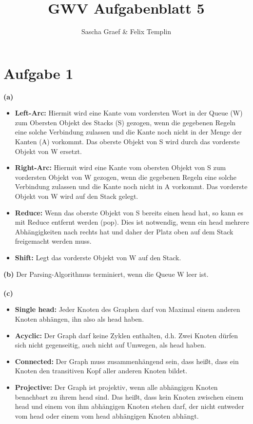 \documentclass[a4paper,10pt]{article}
\title{GWV Aufgabenblatt 5}
\author{Sascha Graef \& Felix Templin}
\begin{document}
\maketitle

\section*{Aufgabe 1}
\textbf{(a)}
\begin{itemize}
 \item \textbf{Left-Arc:} Hiermit wird eine Kante vom vordersten Wort in der Queue (W) zum Obersten Objekt des Stacks (S) gezogen, wenn die gegebenen Regeln eine solche Verbindung 
 zulassen und die Kante noch nicht in der Menge der Kanten (A) vorkommt. Das oberste Objekt von S wird durch das vorderste Objekt von W ersetzt.
 \item \textbf{Right-Arc:} Hiermit wird eine Kante vom obersten Objekt von S zum vordersten Objekt von W gezogen, wenn die gegebenen Regeln eine solche Verbindung 
 zulassen und die Kante noch nicht in A vorkommt. Das vorderste Objekt von W wird auf den Stack gelegt.
 \item \textbf{Reduce:} Wenn das oberste Objekt von S bereits einen head hat, so kann es mit Reduce entfernt werden (pop). Dies ist notwendig, wenn ein head mehrere Abhängigkeiten
 nach rechts hat und daher der Platz oben auf dem Stack freigemacht werden muss.
 \item \textbf{Shift:} Legt das vorderste Objekt von W auf den Stack. 
\end{itemize}
\textbf{(b)}
Der Parsing-Algorithmus terminiert, wenn die Queue W leer ist.\\ \\
\textbf{(c)}
\begin{itemize}
 \item \textbf{Single head:} Jeder Knoten des Graphen darf von Maximal einem anderen Knoten abhängen, ihn also als head haben.
 \item \textbf{Acyclic:} Der Graph darf keine Zyklen enthalten, d.h. Zwei Knoten dürfen sich nicht gegenseitig, auch nicht auf Umwegen, als head haben. 
 \item \textbf{Connected:} Der Graph muss zusammenhängend sein, dass heißt, dass ein Knoten den transitiven Kopf aller anderen Knoten bildet.
 \item \textbf{Projective:} Der Graph ist projektiv, wenn alle abhängigen Knoten benachbart zu ihrem head sind. Das heißt, dass kein Knoten zwischen einem head und einem von ihm 
 abhängigen Knoten stehen darf, der nicht entweder vom head oder einem vom head abhängigen Knoten abhängt. 
\end{itemize}
\end{document}
